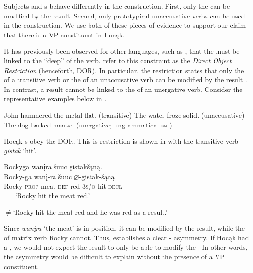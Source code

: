 \documentclass[output=paper]{LSP/langsci}
\begin{document}
 
Subjects and s behave differently in the  construction. First, only the  can be modified by the result. Second, only prototypical unaccusative verbs can be used in the  construction. We use both of these pieces of evidence to support our claim that there is a VP constituent in Hocąk.
 

It has previously been observed for other languages, such as , that the   must be linked to the ``deep''  of the verb.  \citet{LevinRappaportHovav1995} refer to this constraint as the \textit{Direct Object Restriction} (henceforth, DOR). In particular, the restriction states that only the  of a transitive verb or the  of an unaccusative verb can be modified by the result . In contrast, a result  cannot be linked to the  of an unergative verb. Consider the representative  examples below in .

\begin{exe}
\ex\label{ex:jrs:46}
\begin{xlist}
\ex John hammered the metal flat.	(transitive)
\ex The water froze solid.						(unaccusative)
\ex *The dog barked hoarse.	(unergative; ungrammatical as )
\end{xlist}
\end{exe}
	
 
Hocąk s obey the DOR. This is restriction is shown in  with the transitive verb \textit{gistak} `hit'.
 

\begin{exe}
\ex\label{ex:jrs:47} 
\glll Rockyga			wan\k{i}ra			\v{s}uuc 		gistak\v{s}ąną.\\
Rocky-ga		wan\k{i}-ra		\v{s}uuc		$\varnothing$-gistak-\v{s}ąną \\
Rocky-\textsc{prop}	meat-\textsc{def}	red			\textsc{3s/o}-hit-\textsc{decl} \\
\trans $=$ `Rocky hit the meat red.'

$\neq$`Rocky hit the meat red and he was red as a result.'
\end{exe}

 
Since \textit{wan\k{i}ra} `the meat' is in  position, it can be modified by the result, while the  of matrix verb Rocky cannot. Thus,  establishes a clear - asymmetry. If Hocąk had a , we would not expect the result to only be able to modify the . In other words, the asymmetry would be difficult to explain without the presence of a VP constituent.
	
\end{document}

